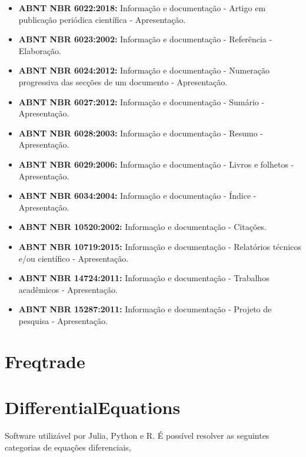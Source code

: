 \documentclass[
12pt,				%
openright,			%
oneside,			%
a4paper,			%
english,			%
french,				%
spanish,			%
brazil,				%
]{abntex2}
\begin{document}
\begin{itemize}
\item \textbf{ABNT NBR 6022:2018:} Informação e documentação -
  Artigo em publicação periódica científica - Apresentação.
\item \textbf{ABNT NBR 6023:2002:} Informação e documentação -
  Referência - Elaboração.
\item \textbf{ABNT NBR 6024:2012:} Informação e documentação -
  Numeração progressiva das secções de um documento - Apresentação.
\item \textbf{ABNT NBR 6027:2012:} Informação e documentação -
  Sumário - Apresentação.
\item \textbf{ABNT NBR 6028:2003:} Informação e documentação -
  Resumo - Apresentação.
\item \textbf{ABNT NBR 6029:2006:} Informação e documentação -
  Livros e folhetos - Apresentação.
\item \textbf{ABNT NBR 6034:2004:} Informação e documentação -
  Índice - Apresentação.
\item \textbf{ABNT NBR 10520:2002:} Informação e documentação -
  Citações.
\item \textbf{ABNT NBR 10719:2015:} Informação e documentação -
  Relatórios técnicos e/ou científico - Apresentação.
\item \textbf{ABNT NBR 14724:2011:} Informação e documentação -
  Trabalhos acadêmicos - Apresentação.
\item \textbf{ABNT NBR 15287:2011:} Informação e documentação -
  Projeto de pesquisa - Apresentação.
\end{itemize}

\section{Freqtrade}


\section{DifferentialEquations}

Software utilizável por Julia, Python e R. É possível resolver as seguintes categorias de equações diferenciais,

\end{document}
